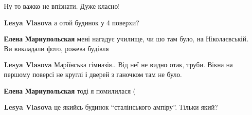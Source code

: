  
 
 
 
 

\qqSecCmt


Ну то важко не впізнати. Дуже класно!

\begin{itemize} %
\textbf{Lesya Vlasova} а отой будинок у 4 поверхи?

\textbf{Елена Мариупольская} мені нагадує училище, чи шо там було, на Ніколаєвській. Ви викладали фото, рожева будівля

\textbf{Lesya Vlasova} Маріїнська гімназія..
Від неї не видно отак, труби. Вікна на першому поверсі не круглі і дверей з ганочком там не було.

\textbf{Елена Мариупольская} тоді я помилилася (

\textbf{Lesya Vlasova} це якийсь будинок \enquote{сталінського ампіру}. Тільки який?
\end{itemize} %
